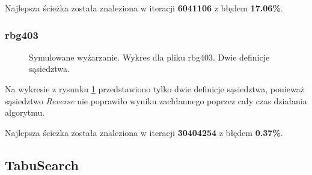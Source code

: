 \documentclass[12pt]{article}
\begin{document}
Najlepsza ścieżka została znaleziona w iteracji \textbf{6041106} z błędem \textbf{17.06\%}.

\subsubsection{rbg403}
\begin{figure}[H]
    \centering
    \caption{Symulowane wyżarzanie. Wykres dla pliku rbg403. Dwie definicje sąsiedztwa.}
    \label{plot:3}
\end{figure}
Na wykresie z rysunku \ref{plot:3} przedstawiono tylko dwie definicje sąsiedztwa, ponieważ sąsiedztwo \textit{Reverse} nie poprawiło wyniku zachłannego poprzez cały czas działania algorytmu.

Najlepsza ścieżka została znaleziona w iteracji \textbf{30404254} z błędem \textbf{0.37\%}.

\clearpage
\subsection{TabuSearch}
\end{document}
